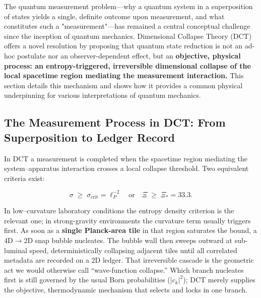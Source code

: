 \documentclass[a4paper, 12pt, oneside]{book}
\numberwithin{equation}{chapter}
\begin{document}
The quantum measurement problem—why a quantum system in a superposition of states yields a single, definite outcome upon measurement, and what constitutes such a "measurement"—has remained a central conceptual challenge since the inception of quantum mechanics. Dimensional Collapse Theory (DCT) offers a novel resolution by proposing that quantum state reduction is not an ad-hoc postulate nor an observer-dependent effect, but an \textbf{objective, physical process: an entropy-triggered, irreversible dimensional collapse of the local spacetime region mediating the measurement interaction.} This section details this mechanism and shows how it provides a common physical underpinning for various interpretations of quantum mechanics.

\subsection[The Measurement Process]{The Measurement Process in DCT: From Superposition to Ledger Record}
\label{ssec:DCTMeasurementProcess}

In DCT a measurement is completed when the spacetime region mediating the
system–apparatus interaction crosses a local collapse threshold.  Two
equivalent criteria exist:

\[
  \sigma \;\ge\;\sigma_{\text{crit}} = \ell_{P}^{-2}
  \quad\text{or}\quad
  \Xi \;\ge\; \Xi_{*}=33.3 .
\]

In low–curvature laboratory conditions the entropy density criterion is
the relevant one; in strong-gravity environments the curvature term
usually triggers first.  As soon as a \textbf{single Planck-area tile} in that
region saturates the bound, a 4D\(\to\)2D snap bubble nucleates.  The
bubble wall then sweeps outward at sub-luminal speed, deterministically
collapsing adjacent tiles until all correlated metadata are recorded on
a 2D ledger.  That irreversible cascade is the geometric act we would
otherwise call “wave-function collapse.”  Which branch nucleates first
is still governed by the usual Born probabilities ($|c_k|^2$); DCT merely supplies
the objective, thermodynamic mechanism that selects and locks in one
branch.\\
\end{document}
